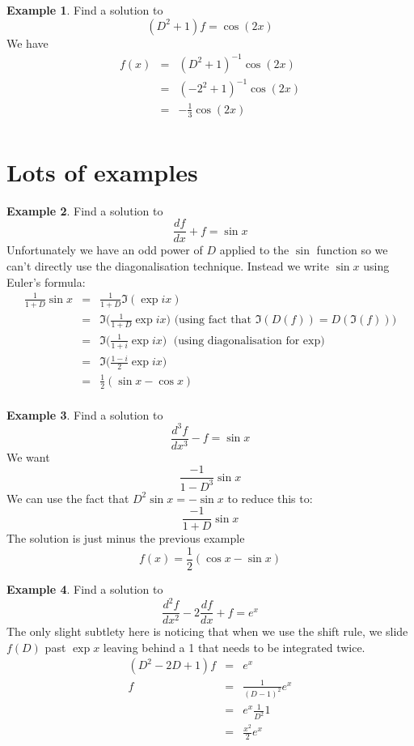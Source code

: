 \documentclass[a4paper]{article}
\theoremstyle{definition}
\newtheorem{example}{Example}[section]
\begin{document}
\begin{example}
Find a solution to
\[
(D^2+1)f = \cos(2x)
\]
We have
\begin{eqnarray*}
f(x) & = & (D^2+1)^{-1}\cos(2x) \\
     & = & (-2^2+1)^{-1}\cos(2x) \\
     & = & -\frac{1}{3}\cos(2x) \\
\end{eqnarray*}
\end{example}

\section{Lots of examples}
\begin{example}
Find a solution to
\[
\frac{df}{dx}+f = \sin x
\]
Unfortunately we have an odd power of $D$ applied to the $\sin$ function so we can't directly use the diagonalisation technique.
Instead we write $\sin x$ using Euler's formula:
\begin{eqnarray*}
\frac{1}{1+D}\sin x & = & \frac{1}{1+D}\Im(\exp{ix}) \\
                    & = & \Im\big(\frac{1}{1+D}\exp{ix}\big) \mbox{ (using fact that $\Im(D(f)) = D(\Im(f))$)} \\
                    & = & \Im\big(\frac{1}{1+i}\exp{ix}\big) \mbox{ (using diagonalisation for $\exp$)} \\
                    & = & \Im\big(\frac{1-i}{2}\exp{ix}\big) \\
                    & = & \frac{1}{2}(\sin x-\cos x) \\
\end{eqnarray*}
\end{example}

\begin{example}
Find a solution to
\[
\frac{d^3f}{dx^3}-f = \sin x
\]
We want
\[
\frac{-1}{1-D^3}\sin x
\]
We can use the fact that $D^2\sin x = -\sin x$ to reduce this to:
\[
\frac{-1}{1+D}\sin x
\]
The solution is just minus the previous example
\[
f(x) = \frac{1}{2}(\cos x-\sin x)
\]
\end{example}

\begin{example}
Find a solution to
\[
\frac{d^2f}{dx^2}-2\frac{df}{dx}+f=e^x
\]
The only slight subtlety here is noticing that when we use the shift rule, we slide $f(D)$ past $\exp x$ leaving behind a 1 that needs to be integrated twice.
\begin{eqnarray*}
(D^2-2D+1)f & = & e^x \\
f & = & \frac{1}{(D-1)^2} e^x \\
  & = & e^x\frac{1}{D^2}1 \\
  & = & \frac{x^2}{2}e^x
\end{eqnarray*}
\end{example}
\end{document}
